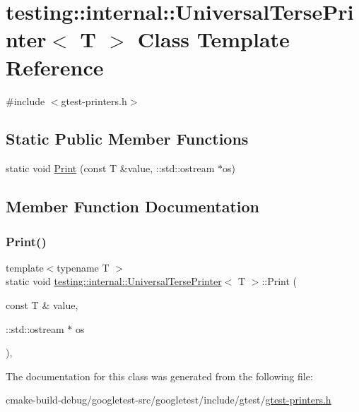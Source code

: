 \hypertarget{classtesting_1_1internal_1_1UniversalTersePrinter}{}\section{testing\+::internal\+::Universal\+Terse\+Printer$<$ T $>$ Class Template Reference}
\label{classtesting_1_1internal_1_1UniversalTersePrinter}


{\ttfamily \#include $<$gtest-\/printers.\+h$>$}

\subsection*{Static Public Member Functions}
\begin{DoxyCompactItemize}
\item 
static void \mbox{\hyperlink{classtesting_1_1internal_1_1UniversalTersePrinter_a042249cdb42fdb77588c9ad54ea7ed54}{Print}} (const T \&value, \+::std\+::ostream $\ast$os)
\end{DoxyCompactItemize}


\subsection{Member Function Documentation}
\mbox{\label{classtesting_1_1internal_1_1UniversalTersePrinter_a042249cdb42fdb77588c9ad54ea7ed54}} 
\subsubsection{\texorpdfstring{Print()}{Print()}}
{\footnotesize\ttfamily template$<$typename T $>$ \\
static void \mbox{\hyperlink{classtesting_1_1internal_1_1UniversalTersePrinter}{testing\+::internal\+::\+Universal\+Terse\+Printer}}$<$ T $>$\+::Print (\begin{DoxyParamCaption}\item[{const T \&}]{value,  }\item[{\+::std\+::ostream $\ast$}]{os }\end{DoxyParamCaption})\hspace{0.3cm}{\ttfamily [inline]}, {\ttfamily [static]}}



The documentation for this class was generated from the following file\+:\begin{DoxyCompactItemize}
\item 
cmake-\/build-\/debug/googletest-\/src/googletest/include/gtest/\mbox{\hyperlink{gtest-printers_8h}{gtest-\/printers.\+h}}\end{DoxyCompactItemize}
